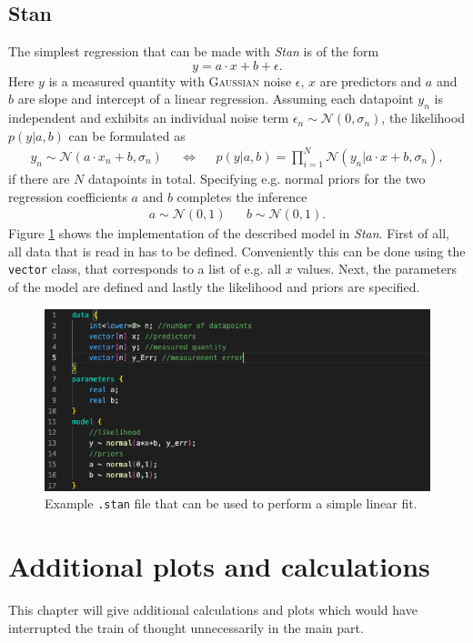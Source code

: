\section{Stan}
The simplest regression that can be made with \emph{Stan} is of the form
\begin{equation}
	y=a\cdot x +b+\epsilon.
\end{equation}
Here $y$ is a measured quantity with \textsc{Gaussian} noise $\epsilon$, $x$ are predictors and $a$ and $b$ are slope and intercept of a linear regression. Assuming each datapoint $y_n$ is independent and exhibits an individual noise term $\epsilon_n\sim\mathcal{N}(0,\sigma_n)$, the likelihood $p(y|a,b)$ can be formulated as
\begin{align}
	y_n\sim\mathcal{N}(a\cdot x_n +b,\sigma_n)&&\Leftrightarrow& &p(y|a,b)=\prod_{i=1}^N\mathcal{N}(y_n|a\cdot x+b,\sigma_n),
\end{align} 
if there are $N$ datapoints in total. Specifying e.g. normal priors for the two regression coefficients $a$ and $b$ completes the inference
\begin{align}
	a\sim\mathcal{N}(0,1)&&b\sim\mathcal{N}(0,1).
\end{align}
Figure \ref{fig:stan} shows the implementation of the described model in \emph{Stan}. First of all, all data that is read in has to be defined. Conveniently this can be done using the \texttt{vector} class, that corresponds to a list of e.g. all $x$ values. Next, the parameters of the model are defined and lastly the likelihood and priors are specified.
\begin{figure}[htbp]
	\centering
	\includegraphics[width=\linewidth]{../demonstration/stanfile.png}
	\caption{Example \texttt{.stan} file that can be used to perform a simple linear fit.}
	\label{fig:stan}
\end{figure}
\chapter{Additional plots and calculations}
\label{sec:app}
This chapter will give additional calculations and plots which would have interrupted the train of thought unnecessarily in the main part. 
